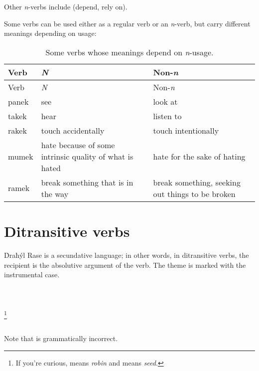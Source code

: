 \documentclass{book}
\begin{document}
Other \emph{n}-verbs include  (depend, rely on).

Some verbs can be used either as a regular verb or an \emph{n}-verb, but carry different meanings depending on usage:

\begin{longtabu} to \linewidth {|l|Y|Y|}
    \caption{Some verbs whose meanings depend on \emph{n}-usage.} \\
    
    \hline
    Verb & \emph{N} & Non-\emph{n} \\
    \hline
    \endfirsthead
    
    \hline
    Verb & \emph{N} & Non-\emph{n} \\
    \hline
    \endhead
    
    \hline
    \endfoot
    
    \hline
    \endlastfoot
    
    panek & see & look at \\
    takek & hear & listen to \\
    rakek & touch accidentally & touch intentionally \\
    mumek & hate because of some intrinsic quality of what is hated & hate for the sake of hating \\
    ramek & break something that is in the way & break something, seeking out things to be broken \\
\end{longtabu}

\section{Ditransitive verbs}

Ḋraħýl Rase is a secundative language; in other words, in ditransitive verbs, the recipient is the absolutive argument of the verb. The theme is marked with the instrumental case. \\
~\\
    \\
    \\
\emph{   }\footnote{If you're curious,  means \emph{robin} and  means \emph{seed}.} \\
~

Note that  is grammatically incorrect.
\end{document}
